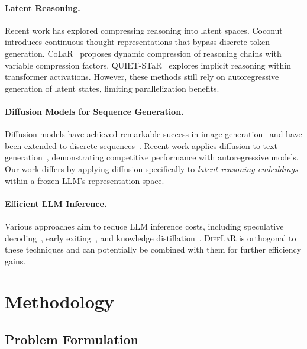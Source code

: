 \documentclass{article}
\newcommand{\difflar}{\textsc{DiffLaR}}
\begin{document}
\paragraph{Latent Reasoning.}
Recent work has explored compressing reasoning into latent spaces. Coconut~\citep{hao2024training} introduces continuous thought representations that bypass discrete token generation. CoLaR~\citep{tan2025colar} proposes dynamic compression of reasoning chains with variable compression factors. QUIET-STaR~\citep{zelikman2024quiet} explores implicit reasoning within transformer activations. However, these methods still rely on autoregressive generation of latent states, limiting parallelization benefits.

\paragraph{Diffusion Models for Sequence Generation.}
Diffusion models have achieved remarkable success in image generation~\citep{ho2020denoising,rombach2022high} and have been extended to discrete sequences~\citep{austin2021structured,li2022diffusion}. Recent work applies diffusion to text generation~\citep{gong2022diffuseq,chen2023analog}, demonstrating competitive performance with autoregressive models. Our work differs by applying diffusion specifically to \emph{latent reasoning embeddings} within a frozen LLM's representation space.

\paragraph{Efficient LLM Inference.}
Various approaches aim to reduce LLM inference costs, including speculative decoding~\citep{leviathan2023fast}, early exiting~\citep{schuster2022confident}, and knowledge distillation~\citep{hinton2015distilling}. \difflar{} is orthogonal to these techniques and can potentially be combined with them for further efficiency gains.

\section{Methodology}
\label{sec:method}

\subsection{Problem Formulation}
\label{sec:problem}
\end{document}
